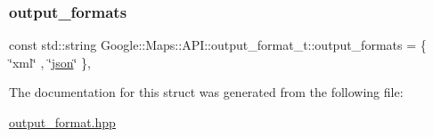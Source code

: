 \mbox{\label{a00048_a53d106f6d688b90fcf744fd3764a73ab}} 
\subsubsection{\texorpdfstring{output\+\_\+formats}{output\_formats}}
{\footnotesize\ttfamily const std\+::string Google\+::\+Maps\+::\+A\+P\+I\+::output\+\_\+format\+\_\+t\+::output\+\_\+formats = \{ \char`\"{}xml\char`\"{} , \char`\"{}\hyperlink{a00011_ab701e3ac61a85b337ec5c1abaad6742d}{json}\char`\"{} \}\hspace{0.3cm}{\ttfamily [static]}, {\ttfamily [private]}}



The documentation for this struct was generated from the following file\+:\begin{DoxyCompactItemize}
\item 
\hyperlink{a00023}{output\+\_\+format.\+hpp}\end{DoxyCompactItemize}
